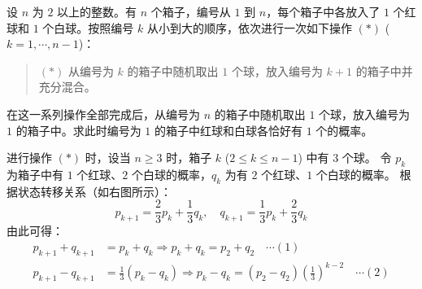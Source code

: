 \begin{questions}

\question
设 $n$ 为 $2$ 以上的整数。有 $n$ 个箱子，编号从 $1$ 到 $n$，每个箱子中各放入了 $1$ 个红球和 $1$ 个白球。按照编号 $k$ 从小到大的顺序，依次进行一次如下操作 $(*)$ ($k = 1, \cdots, n-1$)：

\begin{quote}
    $(*)$ 从编号为 $k$ 的箱子中随机取出 $1$ 个球，放入编号为 $k+1$ 的箱子中并充分混合。
\end{quote}

在这一系列操作全部完成后，从编号为 $n$ 的箱子中随机取出 $1$ 个球，放入编号为 $1$ 的箱子中。求此时编号为 $1$ 的箱子中红球和白球各恰好有 $1$ 个的概率。

\begin{solution}
    进行操作 $(*)$ 时，设当 $n \ge 3$ 时，箱子 $k$ ($2 \le k \le n-1$) 中有 $3$ 个球。
    令 $p_k$ 为箱子中有 $1$ 个红球、$2$ 个白球的概率，$q_k$ 为有 $2$ 个红球、$1$ 个白球的概率。
    根据状态转移关系（如右图所示）：
    \[ p_{k+1} = \frac{2}{3}p_k + \frac{1}{3}q_k, \quad q_{k+1} = \frac{1}{3}p_k + \frac{2}{3}q_k  \]
    由此可得：
    \begin{align*}
        p_{k+1} + q_{k+1} &= p_k + q_k \Rightarrow p_k + q_k = p_2 + q_2 \quad \cdots (1)  \\
        p_{k+1} - q_{k+1} &= \frac{1}{3}(p_k - q_k) \Rightarrow p_k - q_k = (p_2 - q_2) \left( \frac{1}{3} \right)^{k-2} \quad \cdots (2) 
    \end{align*}
    

\end{solution}
\end{questions}
